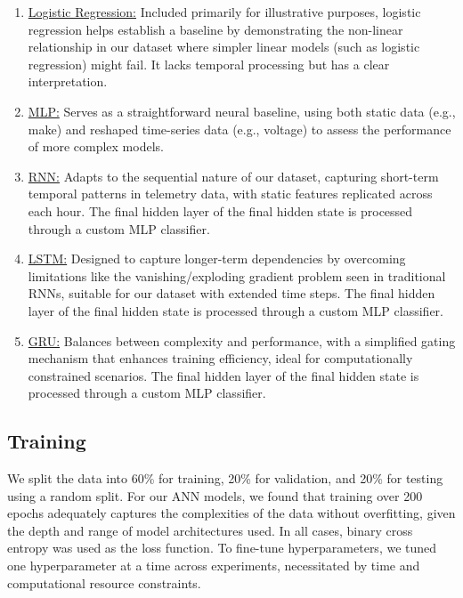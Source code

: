 \documentclass{article}
\begin{document}
\begin{enumerate}
    \item \uline{Logistic Regression:} Included primarily for illustrative purposes, logistic regression helps establish a baseline by demonstrating the non-linear relationship in our dataset where simpler linear models (such as logistic regression) might fail. It lacks temporal processing but has a clear interpretation.
    
    \item \uline{MLP:} Serves as a straightforward neural baseline, using both static data (e.g., make) and reshaped time-series data (e.g., voltage) to assess the performance of more complex models.
    
    \item \uline{RNN:} Adapts to the sequential nature of our dataset, capturing short-term temporal patterns in telemetry data, with static features replicated across each hour. The final hidden layer of the final hidden state is processed through a custom MLP classifier.
    
    \item \uline{LSTM:} Designed to capture longer-term dependencies by overcoming limitations like the vanishing/exploding gradient problem seen in traditional RNNs, suitable for our dataset with extended time steps. The final hidden layer of the final hidden state is processed through a custom MLP classifier.

    \item \uline{GRU:} Balances between complexity and performance, with a simplified gating mechanism that enhances training efficiency, ideal for computationally constrained scenarios. The final hidden layer of the final hidden state is processed through a custom MLP classifier.
    
\end{enumerate}

\subsection{Training}

We split the data into 60\% for training, 20\% for validation, and 20\% for testing using a random split. For our ANN models, we found that training over 200 epochs adequately captures the complexities of the data without overfitting, given the depth and range of model architectures used. In all cases, binary cross entropy was used as the loss function. To fine-tune hyperparameters, we tuned one hyperparameter at a time across experiments, necessitated by time and computational resource constraints. 
\end{document}

